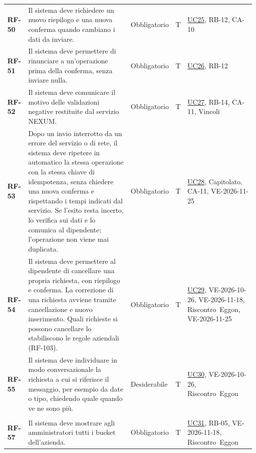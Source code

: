 \documentclass[documento]{gpt}
\begin{document}
{\begin{longtable}{@{}>{\raggedright\arraybackslash}p{1.35cm}>{\raggedright\arraybackslash}p{7.3cm}>{\raggedright\arraybackslash}p{1.9cm}>{\centering\arraybackslash}p{0.75cm}>{\raggedright\arraybackslash}p{3.1cm}@{}}
\leavevmode\hypertarget{req:RF-50}{\textbf{RF-50}} & Il sistema deve richiedere un nuovo riepilogo e una nuova conferma quando cambiano i dati da inviare. & Obbligatorio & T & \hyperref[uc:op_modifica]{UC25}, \mbox{RB-12}, \mbox{CA-10} \\
\leavevmode\hypertarget{req:RF-51}{\textbf{RF-51}} & Il sistema deve permettere di rinunciare a un’operazione prima della conferma, senza inviare nulla. & Obbligatorio & T & \hyperref[uc:op_rinuncia]{UC26}, \mbox{RB-12} \\
\leavevmode\hypertarget{req:RF-52}{\textbf{RF-52}} & Il sistema deve comunicare il motivo delle validazioni negative restituite dal servizio NEXUM. & Obbligatorio & T & \hyperref[uc:op_rifiuto]{UC27}, \mbox{RB-14}, \mbox{CA-11}, \mbox{Vincoli} \\
\leavevmode\hypertarget{req:RF-53}{\textbf{RF-53}} & Dopo un invio interrotto da un errore del servizio o di rete, il sistema deve ripetere in automatico la stessa operazione con la stessa chiave di idempotenza, senza chiedere una nuova conferma e rispettando i tempi indicati dal servizio. Se l’esito resta incerto, lo verifica sui dati e lo comunica al dipendente; l’operazione non viene mai duplicata. & Obbligatorio & T & \hyperref[uc:op_incerto]{UC28}, \mbox{Capitolato}, \mbox{CA-11}, \mbox{VE-2026-11-25} \\
\leavevmode\hypertarget{req:RF-54}{\textbf{RF-54}} & Il sistema deve permettere al dipendente di cancellare una propria richiesta, con riepilogo e conferma. La correzione di una richiesta avviene tramite cancellazione e nuovo inserimento. Quali richieste si possono cancellare lo stabiliscono le regole aziendali (RF-103). & Obbligatorio & T & \hyperref[uc:annulla_inv]{UC29}, \mbox{VE-2026-10-26}, \mbox{VE-2026-11-18}, \mbox{Riscontro Eggon}, \mbox{VE-2026-11-25} \\
\leavevmode\hypertarget{req:RF-55}{\textbf{RF-55}} & Il sistema deve individuare in modo conversazionale la richiesta a cui si riferisce il messaggio, per esempio da date o tipo, chiedendo quale quando ve ne sono più. & Desiderabile & T & \hyperref[uc:sel_rich]{UC30}, \mbox{VE-2026-10-26}, \mbox{Riscontro Eggon} \\
\addlinespace[3pt]\multicolumn{5}{@{}l}{\textbf{\sffamily Gestione dei bucket}} \\ \addlinespace[2pt]
\leavevmode\hypertarget{req:RF-57}{\textbf{RF-57}} & Il sistema deve mostrare agli amministratori tutti i bucket dell’azienda. & Obbligatorio & T & \hyperref[uc:bk_elenco]{UC31}, \mbox{RB-05}, \mbox{VE-2026-11-18}, \mbox{Riscontro Eggon} \\

\end{longtable}}
\end{document}
